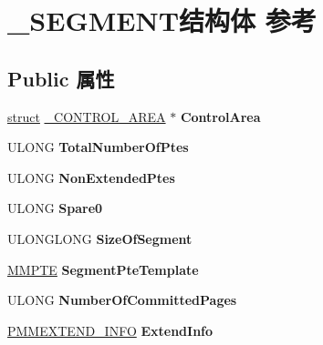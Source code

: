 \hypertarget{struct___s_e_g_m_e_n_t}{}\section{\+\_\+\+S\+E\+G\+M\+E\+N\+T结构体 参考}
\label{struct___s_e_g_m_e_n_t}
\subsection*{Public 属性}
\begin{DoxyCompactItemize}
\item 
\mbox{\label{struct___s_e_g_m_e_n_t_a3460a99e8c67f16dc5bb98427c88ae7c}} 
\hyperlink{interfacestruct}{struct} \hyperlink{struct___c_o_n_t_r_o_l___a_r_e_a}{\+\_\+\+C\+O\+N\+T\+R\+O\+L\+\_\+\+A\+R\+EA} $\ast$ {\bfseries Control\+Area}
\item 
\mbox{\label{struct___s_e_g_m_e_n_t_a51ab317a203a88a827b3dc55b04648bb}} 
U\+L\+O\+NG {\bfseries Total\+Number\+Of\+Ptes}
\item 
\mbox{\label{struct___s_e_g_m_e_n_t_aebf9ceda8c14b4b20276f2d90b0b4d29}} 
U\+L\+O\+NG {\bfseries Non\+Extended\+Ptes}
\item 
\mbox{\label{struct___s_e_g_m_e_n_t_addc04ff2599a38ce720035ef2202db3f}} 
U\+L\+O\+NG {\bfseries Spare0}
\item 
\mbox{\label{struct___s_e_g_m_e_n_t_abce0951f19c6eb7a6b058fbdc1b8ba1b}} 
U\+L\+O\+N\+G\+L\+O\+NG {\bfseries Size\+Of\+Segment}
\item 
\mbox{\label{struct___s_e_g_m_e_n_t_a76b20ba81992e6bb06d27ec26058f50c}} 
\hyperlink{struct___m_m_p_t_e}{M\+M\+P\+TE} {\bfseries Segment\+Pte\+Template}
\item 
\mbox{\label{struct___s_e_g_m_e_n_t_af6b23c3fad4db7e88e16d5dcaf3abd24}} 
U\+L\+O\+NG {\bfseries Number\+Of\+Committed\+Pages}
\item 
\mbox{\label{struct___s_e_g_m_e_n_t_a26878cc7d6034b2481769e81dcdaf9a8}} 
\hyperlink{struct___m_m_e_x_t_e_n_d___i_n_f_o}{P\+M\+M\+E\+X\+T\+E\+N\+D\+\_\+\+I\+N\+FO} {\bfseries Extend\+Info}

\end{DoxyCompactItemize}

